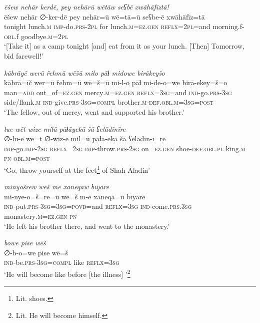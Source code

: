 \ea \label{PM.21}
\textit{ēšew nehār kerdē, pey nehārū wētāw seʕbē xwāhāfīztā!} \\ 
\gll ēšew nehār ∅-ker-dē pey nehār=ū wē=tā=ū seʕbe-ē xwāhāfīz=tā \\ 
 tonight lunch\textsc{.m} \textsc{imp-}do\textsc{.prs}-\textsc{2pl} for lunch\textsc{.m}\textsc{\textsc{=ez.gen}} \textsc{reflx}=\textsc{2pl}=and morning.f\textsc{-obl}.f goodbye\textsc{.m}=\textsc{2pl} \\ 
\glt `[Take it] as a camp tonight [and] eat from it as your lunch. [Then] Tomorrow, bid farewell!'
\z 
 
\ea \label{DG.16}
\textit{kābrāyč werū řehmū wēšū milo pāɫ midowe birākeyšo} \\ 
\gll kābrā=īč wer=ū řehm=ū wē=š=ū mi-l-o pāɫ mi-de-o=we birā-ekey=š=o \\ 
 man\textsc{=add} out\_of\textsc{=ez}\textsc{.gen} mercy\textsc{.m}\textsc{=ez}\textsc{.gen} \textsc{reflx}\textsc{=3sg}=and \textsc{ind-}go\textsc{.prs}\textsc{-3sg} side/flank\textsc{.m} \textsc{ind-}give\textsc{.prs}\textsc{-3sg}\textsc{=\textsc{compl}} brother\textsc{.m}\textsc{-def}\textsc{.obl}\textsc{.m}\textsc{=3sg}\textsc{=\textsc{post}} \\ 
\glt `The fellow, out of mercy, went and supported his brother.'
\z 
 
\ea \label{DG.27}
\textit{lue wēt wize milū pāɫāyekā šā ʕelādīnīre} \\ 
\gll ∅-lu-e wē=t ∅-wiz-e mil=ū pāɫā-ekā šā ʕelādīn-ī=re \\ 
 \textsc{imp-}go.\textsc{imp-}\textsc{2sg} \textsc{reflx}\textsc{=\textsc{2sg}} \textsc{imp-}throw\textsc{.prs}-\textsc{2sg} on\textsc{=ez}\textsc{.gen} shoe\textsc{-def}\textsc{.obl}\textsc{.pl} king\textsc{.m} \textsc{pn}\textsc{-obl}\textsc{.m}\textsc{=\textsc{post}} \\ 
\glt `Go, throw yourself at the feet\footnote{Lit. shoes.} of Shah Aladin'
\z 
 
\ea \label{DG.32}
\textit{minyošrew wēš mē xāneqāw bīyārē} \\ 
\gll mi-nye-o=š=re=ū wē=š m-ē xāneqā=ū bīyārē \\ 
 \textsc{ind-}put\textsc{.prs}\textsc{-3sg}\textsc{=3sg}\textsc{=\textsc{povb}}=and \textsc{reflx}\textsc{=3sg} \textsc{ind-}come\textsc{.prs}\textsc{.3sg} monastery\textsc{.m}\textsc{=ez}\textsc{.gen} \textsc{pn} \\ 
\glt `He left his brother there, and went to the monastery.'
\z 
 
\ea \label{DG.52}
\textit{bowe pise wēš} \\ 
\gll ∅-b-o=we pise wē=š \\ 
 \textsc{ind-}be\textsc{.prs}\textsc{-3sg}\textsc{=\textsc{compl}} like \textsc{reflx}\textsc{=3sg} \\ 
\glt `He will become like before [the illness] '\footnote{Lit. He will become himself.}
\z 
 
